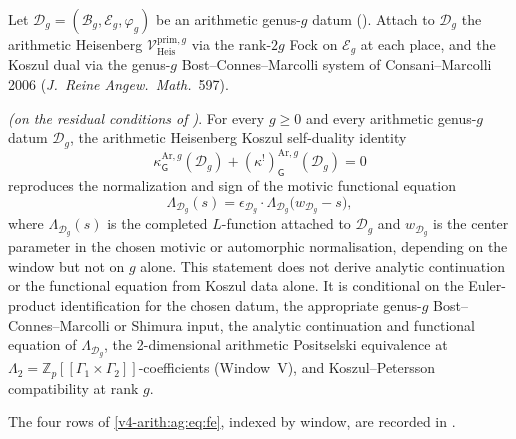 Let \(\mathcal{D}_g=(\mathcal{B}_g,\mathcal{E}_g,\varphi_g)\) be an arithmetic
genus-\(g\) datum (). Attach to \(\mathcal{D}_g\)
the arithmetic Heisenberg \(\mathcal{V}^{\mathrm{prim},g}_{\mathrm{Heis}}\)
via the rank-\(2g\) Fock on \(\mathcal{E}_g\) at each place, and the Koszul
dual via the genus-\(g\) Bost--Connes--Marcolli system of Consani--Marcolli
2006 (\emph{J.~Reine Angew.~Math.}~597).

\begin{theorem}
\label{v4-arith:ag:thm:all-genus}
\ClaimStatusProvedHereConditional \emph{(on the residual conditions of
)}. For every \(g\geq 0\) and every arithmetic
genus-\(g\) datum \(\mathcal{D}_g\), the arithmetic Heisenberg Koszul
self-duality identity
\begin{equation}
\label{v4-arith:ag:eq:master}
\kappa^{\mathrm{Ar},g}_{\mathsf{G}}(\mathcal{D}_g)
+(\kappa^{!})^{\mathrm{Ar},g}_{\mathsf{G}}(\mathcal{D}_g)=0
\end{equation}
reproduces the normalization and sign of the motivic functional equation
\begin{equation}
\label{v4-arith:ag:eq:fe}
\Lambda_{\mathcal{D}_g}(s)
=\epsilon_{\mathcal{D}_g}\cdot\Lambda_{\mathcal{D}_g}\bigl(w_{\mathcal{D}_g}-s\bigr),
\end{equation}
where \(\Lambda_{\mathcal{D}_g}(s)\) is the completed \(L\)-function attached to
\(\mathcal{D}_g\) and \(w_{\mathcal{D}_g}\) is the center parameter in
the chosen motivic or automorphic normalisation, depending on the
window but not on \(g\) alone.
This statement does not derive analytic continuation or the functional
equation from Koszul data alone. It is conditional on the Euler-product identification for
the chosen datum, the appropriate genus-\(g\) Bost--Connes--Marcolli or
Shimura input, the analytic continuation and functional equation of
\(\Lambda_{\mathcal{D}_g}\), the 2-dimensional arithmetic Positselski
equivalence at
\(\Lambda_2=\mathbb{Z}_p[[\Gamma_1\times\Gamma_2]]\)-coefficients
(Window~V), and Koszul--Petersson compatibility at rank \(g\).
\end{theorem}

The four rows of \eqref{v4-arith:ag:eq:fe}, indexed by window, are
recorded in .

